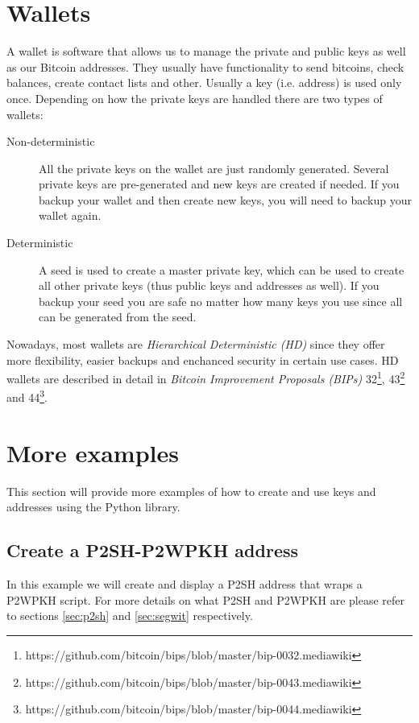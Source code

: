 \section{Wallets}

A wallet is software that allows us to manage the private and public keys as well as our Bitcoin addresses. They usually have functionality to send bitcoins, check balances, create contact lists and other. Usually a key (i.e. address) is used only once. Depending on how the private keys are handled there are two types of wallets:

\begin{description}
\item[Non-deterministic] All the private keys on the wallet are just randomly generated. Several private keys are pre-generated and new keys are created if needed. If you backup your wallet and then create new keys, you will need to backup your wallet again.
\item[Deterministic] A seed is used to create a master private key, which can be used to create all other private keys (thus public keys and addresses as well). If you backup your seed you are safe no matter how many keys you use since all can be generated from the seed.
\end{description}

Nowadays, most wallets are \emph{Hierarchical Deterministic (HD)} since they offer more flexibility, easier backups and enchanced security in certain use cases. HD wallets are described in detail in \emph{Bitcoin Improvement Proposals (BIPs)} 32\footnote{https://github.com/bitcoin/bips/blob/master/bip-0032.mediawiki}, 43\footnote{https://github.com/bitcoin/bips/blob/master/bip-0043.mediawiki} and 44\footnote{https://github.com/bitcoin/bips/blob/master/bip-0044.mediawiki}. 


\section{More examples}
This section will provide more examples of how to create and use keys and addresses using the  Python library.

\subsection*{Create a P2SH-P2WPKH address}
In this example we will create and display a P2SH address that wraps a P2WPKH script. For more details on what P2SH and P2WPKH are please refer to sections \ref{sec:p2sh} and \ref{sec:segwit} respectively.

